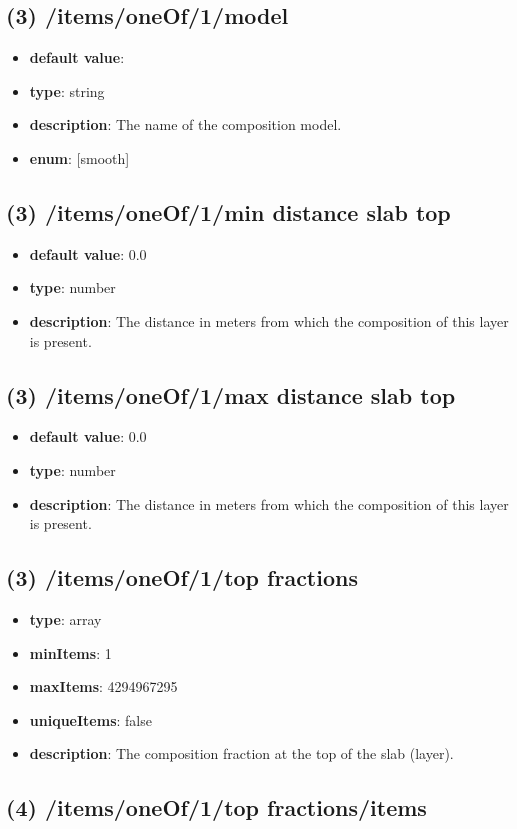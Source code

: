 \subsection{(3) /items/oneOf/1/model}
\begin{itemize}[leftmargin=3em]\item {\bf default value}: 
\item {\bf type}: string
\item {\bf description}: The name of the composition model.
\item {\bf enum}: [smooth]\end{itemize}\subsection{(3) /items/oneOf/1/min distance slab top}
\begin{itemize}[leftmargin=3em]\item {\bf default value}: 0.0
\item {\bf type}: number
\item {\bf description}: The distance in meters from which the composition of this layer is present.
\end{itemize}\subsection{(3) /items/oneOf/1/max distance slab top}
\begin{itemize}[leftmargin=3em]\item {\bf default value}: 0.0
\item {\bf type}: number
\item {\bf description}: The distance in meters from which the composition of this layer is present.
\end{itemize}\subsection{(3) /items/oneOf/1/top fractions}
\begin{itemize}[leftmargin=3em]\item {\bf type}: array
\item {\bf minItems}: 1
\item {\bf maxItems}: 4294967295
\item {\bf uniqueItems}: false
\item {\bf description}: The composition fraction at the top of the slab (layer).
\end{itemize}\subsection{(4) /items/oneOf/1/top fractions/items}
